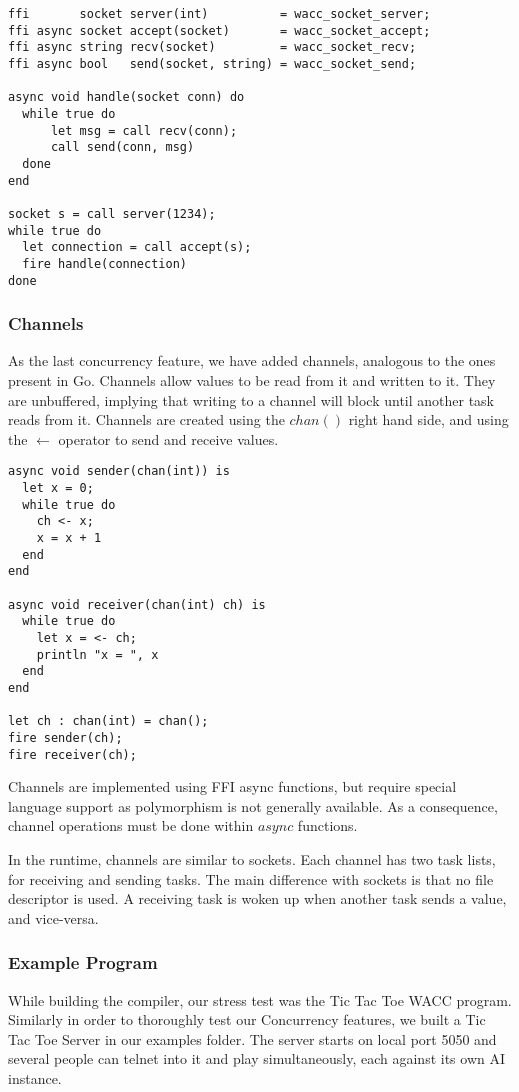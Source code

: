 \documentclass{article}
\begin{document}
\begin{lstlisting}
ffi       socket server(int)          = wacc_socket_server;
ffi async socket accept(socket)       = wacc_socket_accept;
ffi async string recv(socket)         = wacc_socket_recv;
ffi async bool   send(socket, string) = wacc_socket_send;

async void handle(socket conn) do
  while true do
      let msg = call recv(conn);
      call send(conn, msg)
  done
end

socket s = call server(1234);
while true do
  let connection = call accept(s);
  fire handle(connection)
done
\end{lstlisting}

\subsubsection{Channels}
As the last concurrency feature, we have added channels, analogous to the ones present in Go.
Channels allow values to be read from it and written to it. They are unbuffered, implying that writing to a channel will block
until another task reads from it. Channels are created using the $chan()$ right hand side, and using the $\leftarrow$ operator
to send and receive values.

\begin{lstlisting}
async void sender(chan(int)) is
  let x = 0;
  while true do
    ch <- x;
    x = x + 1
  end
end

async void receiver(chan(int) ch) is
  while true do
    let x = <- ch;
    println "x = ", x
  end
end

let ch : chan(int) = chan();
fire sender(ch);
fire receiver(ch);
\end{lstlisting}

Channels are implemented using FFI async functions, but require special language support as polymorphism is not generally
available. As a consequence, channel operations must be done within $async$ functions.

In the runtime, channels are similar to sockets. Each channel has two task lists, for receiving and sending tasks.
The main difference with sockets is that no file descriptor is used. A receiving task is woken up when another task sends
a value, and vice-versa.

\subsubsection{Example Program}
While building the compiler, our stress test was the Tic Tac Toe WACC program. Similarly in order to thoroughly test our Concurrency features, we built a
Tic Tac Toe Server in our examples folder. The server starts on local port 5050 and several people can telnet into it and play simultaneously, each against its
own AI instance. 
\end{document}
